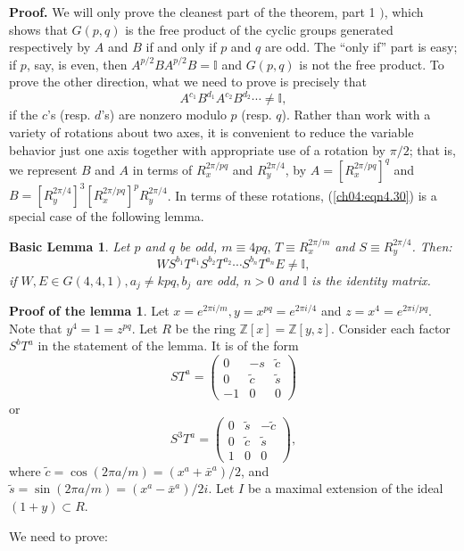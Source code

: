 \documentclass[reqno]{stml-l}
\theoremstyle{plain}
\newtheorem{lemmab}[theorem]{Basic Lemma}
\theoremstyle{definition}
\newtheorem*{proofl*}{Proof of the lemma}
\numberwithin{equation}{chapter}
\begin{document}
\noindent \textbf{Proof.} We will only prove the cleanest
part of the theorem, part 1 $)$, which shows that $G(p, q)$
is the free product of the cyclic groups generated
respectively by $A$ and $B$ if and only if $p$ and $q$ are
odd. The ``only if'' part is easy; if $p$, say, is even,
then $A^{p/2}BA^{p/2}B=\mathbb{I}$ and $G(p, q)$ is not the
free product. To prove the other direction, what we need to
prove is precisely that
\begin{equation}\label{ch04:eqn4.30}
A^{c_{1}}B^{d_{1}}A^{c_{2}}B^{d_{2}}\cdots\neq \mathbb{I},
\end{equation}
if the $c$'s (resp. $d$'s) are nonzero modulo $p$ (resp. $q$). Rather than work with a variety of rotations about two axes, it is convenient to reduce the variable behavior just one axis together with appropriate use of a rotation by $\pi/2$; that is, we represent $B$ and $A$ in terms of $R_{x}^{2\pi/pq}$ and $R_{y}^{2\pi/4}$, by $A=[R_{x}^{2\pi/pq}]^{q}$ and $B=[R_{y}^{2\pi/4}]^{3}[R_{x}^{2\pi/pq}]^{p}R_{y}^{2\pi/4}$. In terms of these rotations, (\ref{ch04:eqn4.30}) is a special case of the following lemma.

\begin{lemmab}\label{ch04:lem4.8}
Let $p$ and $q$ be odd, $m\equiv 4pq,\,T\equiv R_{x}^{2\pi/m}$ and $S\equiv R_{y}^{2\pi/4}$. Then:
\begin{equation}\label{ch04:eqn4.31}
WS^{b_{1}}T^{a_{1}}S^{b_{2}}T^{a_{2}}\cdots S^{b_{n}}T^{a_{n}}E\neq \mathbb{I},
\end{equation}
if $W,E\in G(4,4,1),a_{j}\neq kpq,b_{j}$ are odd, $n>0$ and $\mathbb{I}$ is the identity matrix.
\end{lemmab}

\begin{proofl*}
Let $x=e^{2\pi i/m},y=x^{pq}=e^{2\pi i/4}$ and $z=x^{4}= e^{2\pi i/pq}$. Note that $y^{4}=1=z^{pq}$. Let $R$ be the ring $\mathbb{Z}[x]=\mathbb{Z}[y, z]$. Consider each factor $S^{b}T^{a}$ in the statement of the lemma. It is of the form
\begin{equation}\label{ch04:eqn4.32}
ST^{a}=\left(\begin{matrix}
0&-s&\tilde{c}\\
0&\tilde{c}&\tilde{s}\\
-1&0&0\end{matrix}\right)
\end{equation}
or
\begin{equation}\label{ch04:eqn4.33}
S^{3}T^{a}=\left(\begin{matrix}
0&\tilde{s}&-\tilde{c}\\
0&\tilde{c}&\tilde{s}\\
1&0&0\end{matrix}\right),
\end{equation}
where $\tilde{c}=\cos(2\pi a/m)=(x^{a}+\bar{x}^{a})/2$, and $\tilde{s}=\sin(2\pi a/m)= (x^{a}-\bar{x}^{a})/2i$. Let $I$ be a maximal extension of the ideal $(1+y)\subset R$.

We need to prove:
\end{proofl*}
\end{document}
